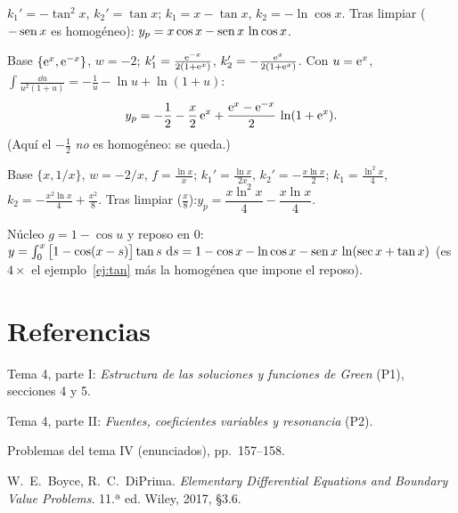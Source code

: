 \documentclass[11pt,twoside]{article}
\begin{document}
\begin{problema}[$y''+y=\sec x\tan x$]\label{prop:2}
\end{problema}
\begin{resolucion}
$k_1'=-\tan^2x$, $k_2'=\tan x$; $k_1=x-\tan x$, $k_2=-\ln\cos x$. Tras limpiar ($-\operatorname{sen} x$ es homogéneo):\quad
$y_p=x\cos x-\operatorname{sen} x\,\ln\cos x$.
\end{resolucion}

\begin{problema}[$y''-y=\dfrac{1}{1+\e^{x}}$]\label{prop:3}
\end{problema}
\begin{resolucion}
Base $\{\mathrm{e}^{x},\mathrm{e}^{-x}\}$, $w=-2$; $k_1'=\frac{\mathrm{e}^{-x}}{2(1+\mathrm{e}^{x})}$, $k_2'=-\frac{\mathrm{e}^{x}}{2(1+\mathrm{e}^{x})}$. Con $u=\mathrm{e}^{x}$,
$\int\frac{\dd u}{u^2(1+u)}=-\frac1u-\ln u+\ln(1+u)$:
\begin{equation*}
y_p=-\frac12-\frac x2\,\mathrm{e}^{x}+\frac{\mathrm{e}^{x}-\mathrm{e}^{-x}}{2}\,\ln(1+\mathrm{e}^{x}).
\end{equation*}
(Aquí el $-\frac12$ \emph{no} es homogéneo: se queda.)
\end{resolucion}

\begin{problema}[$x^2y''+xy'-y=x\ln x$, $\ x>0$]\label{prop:4}
\end{problema}
\begin{resolucion}
Base $\{x,1/x\}$, $w=-2/x$, $f=\frac{\ln x}{x}$; $k_1'=\frac{\ln x}{2x}$, $k_2'=-\frac{x\ln x}{2}$; $k_1=\frac{\ln^2x}{4}$,
$k_2=-\frac{x^2\ln x}{4}+\frac{x^2}{8}$. Tras limpiar ($\frac x8$):\quad $y_p=\dfrac{x\ln^2x}{4}-\dfrac{x\ln x}{4}$.
\end{resolucion}

\begin{problema}[$y'''+y'=\tan x$, $\ y(0)=y'(0)=y''(0)=0$]\label{prop:5}
\end{problema}
\begin{resolucion}
Núcleo $g=1-\cos u$ y reposo en $0$: $y=\int_0^x\big[1-\cos(x-s)\big]\tan s\,\mathop{}\!\mathrm{d} s
=1-\cos x-\ln\cos x-\operatorname{sen} x\,\ln(\sec x+\tan x)$ (es $4\times$ el ejemplo~\ref{ej:tan} más la homogénea que impone el reposo).
\end{resolucion}

\section*{Referencias}
{\small
\begin{enumerate}[label={[\arabic*]},leftmargin=2em,itemsep=1pt]
\item Tema 4, parte I: \emph{Estructura de las soluciones y funciones de Green} (P1), secciones 4 y 5.
\item Tema 4, parte II: \emph{Fuentes, coeficientes variables y resonancia} (P2).
\item Problemas del tema IV (enunciados), pp.~157--158.
\item W.~E.~Boyce, R.~C.~DiPrima. \emph{Elementary Differential Equations and Boundary Value Problems}. 11.ª ed. Wiley, 2017, §3.6.
\end{enumerate}}
\end{document}
